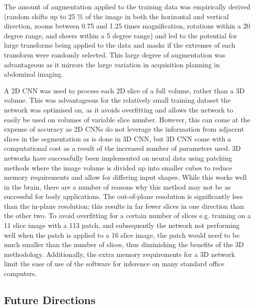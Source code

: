 The amount of augmentation applied to the training data was empirically derived (random shifts up to 25 \% of the image in both the horizontal and vertical direction, zooms between 0.75 and 1.25 times magnification, rotations within a 20 degree range, and sheers within a 5 degree range) and led to the potential for large transforms being applied to the data and masks if the extremes of each transform were randomly selected. This large degree of augmentation was advantageous as it mirrors the large variation in acquisition planning in abdominal imaging. 

A 2D \ac{CNN} was used to process each 2D slice of a full volume, rather than a 3D volume. This was advantageous for the relatively small training dataset the network was optimised on, as it avoids overfitting and allows the network to easily be used on volumes of variable slice number. However, this can come at the expense of accuracy as 2D \ac{CNN}s do not leverage the information from adjacent slices in the segmentation as is done in 3D \ac{CNN}, but 3D \ac{CNN} come with a computational cost as a result of the increased number of parameters used. 3D networks have successfully been implemented on neural data using patching methods where the image volume is divided up into smaller cubes \cite{wachinger_deepnat_2018} to reduce memory requirements and allow for differing input shapes. While this works well in the brain, there are a number of reasons why this method may not be as successful for body applications. The out-of-plane resolution is significantly less than the in-plane resolution; this results in far fewer slices in one direction than the other two. To avoid overfitting for a certain number of slices e.g. training on a 11 slice image with a 113 patch, and subsequently the network not performing well when the patch is applied to a 16 slice image, the patch would need to be much smaller than the number of slices, thus diminishing the benefits of the 3D methodology. Additionally, the extra memory requirements for a 3D network limit the ease of use of the software for inference on many standard office computers.

\subsection{Future Directions}

